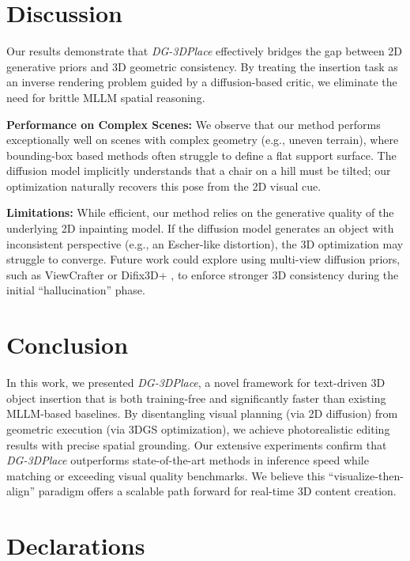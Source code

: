 \documentclass[pdflatex,sn-mathphys-num]{sn-jnl}%
\theoremstyle{thmstyleone}%
\theoremstyle{thmstyletwo}%
\theoremstyle{thmstylethree}%
\begin{document}
\section{Discussion}\label{sec:discussion}
Our results demonstrate that \textit{DG-3DPlace} effectively bridges the gap between 2D generative priors and 3D geometric consistency. By treating the insertion task as an inverse rendering problem guided by a diffusion-based critic, we eliminate the need for brittle MLLM spatial reasoning.

\textbf{Performance on Complex Scenes:}
We observe that our method performs exceptionally well on scenes with complex geometry (e.g., uneven terrain), where bounding-box based methods often struggle to define a flat support surface. The diffusion model implicitly understands that a chair on a hill must be tilted; our optimization naturally recovers this pose from the 2D visual cue.

\textbf{Limitations:}
While efficient, our method relies on the generative quality of the underlying 2D inpainting model. If the diffusion model generates an object with inconsistent perspective (e.g., an Escher-like distortion), the 3D optimization may struggle to converge. Future work could explore using multi-view diffusion priors, such as ViewCrafter \cite{viewcrafter} or Difix3D+ \cite{difix3d}, to enforce stronger 3D consistency during the initial ``hallucination'' phase.

\section{Conclusion}\label{sec:conclusion}
In this work, we presented \textit{DG-3DPlace}, a novel framework for text-driven 3D object insertion that is both training-free and significantly faster than existing MLLM-based baselines. By disentangling visual planning (via 2D diffusion) from geometric execution (via 3DGS optimization), we achieve photorealistic editing results with precise spatial grounding. Our extensive experiments confirm that \textit{DG-3DPlace} outperforms state-of-the-art methods in inference speed while matching or exceeding visual quality benchmarks. We believe this ``visualize-then-align'' paradigm offers a scalable path forward for real-time 3D content creation.

\backmatter

\section*{Declarations}
\end{document}
